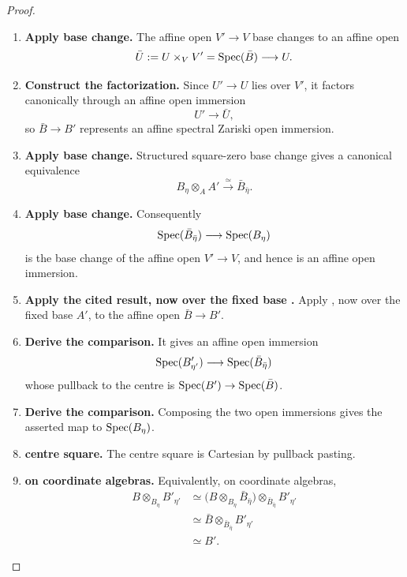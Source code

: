 \begin{proof}
\leavevmode
\begin{enumerate}[label=\textup{(\arabic*)}]
    \item \textbf{Apply base change.}
    The affine open \(V'\to V\) base changes to an affine open
    \[
        \bar U:=U\times_VV'=\operatorname{Spec}(\bar B)
        \longrightarrow U.
    \]

    \item \textbf{Construct the factorization.}
    Since \(U'\to U\) lies over \(V'\), it factors canonically through an affine open
    immersion
    \[
        U'\longrightarrow\bar U,
    \]
    so \(\bar B\to B'\) represents an affine spectral Zariski open immersion.

    \item \textbf{Apply base change.}
    Structured square-zero base change gives a canonical equivalence
    \[
        B_\eta\otimes_AA'
        \xrightarrow{\simeq}
        \bar B_{\bar\eta}.
    \]

    \item \textbf{Apply base change.}
    Consequently
    \[
        \operatorname{Spec}(\bar B_{\bar\eta})
        \longrightarrow
        \operatorname{Spec}(B_\eta)
    \]
    is the base change of the affine open \(V'\to V\), and hence is an affine open immersion.

    \item \textbf{Apply the cited result, now over the fixed base .}
    Apply , now over the fixed base \(A'\), to the
    affine open \(\bar B\to B'\).

    \item \textbf{Derive the comparison.}
    It gives an affine open immersion
    \[
        \operatorname{Spec}(B'_{\eta'})
        \longrightarrow
        \operatorname{Spec}(\bar B_{\bar\eta})
    \]
    whose pullback to the centre is \(\operatorname{Spec}(B')\to\operatorname{Spec}(\bar B)\).

    \item \textbf{Derive the comparison.}
    Composing the two open immersions gives the asserted map to \(\operatorname{Spec}(B_\eta)\).

    \item \textbf{centre square.}
    The centre square is Cartesian by pullback pasting.

    \item \textbf{on coordinate algebras.}
    Equivalently, on coordinate algebras,
    \[
    \begin{aligned}
        B\otimes_{B_\eta}B'_{\eta'}
        &\simeq
        \bigl(B\otimes_{B_\eta}\bar B_{\bar\eta}\bigr)
        \otimes_{\bar B_{\bar\eta}}B'_{\eta'}
        \\
        &\simeq
        \bar B\otimes_{\bar B_{\bar\eta}}B'_{\eta'}
        \\
        &\simeq
        B'.
    \end{aligned}
    \]


\end{enumerate}
\end{proof}
